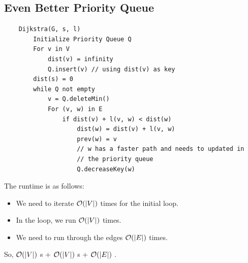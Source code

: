 \documentclass[letterpaper]{article}
\begin{document}
\subsection{Even Better Priority Queue}
\begin{verbatim}
    Dijkstra(G, s, l)
        Initialize Priority Queue Q 
        For v in V
            dist(v) = infinity
            Q.insert(v) // using dist(v) as key
        dist(s) = 0
        while Q not empty
            v = Q.deleteMin()
            For (v, w) in E
                if dist(v) + l(v, w) < dist(w)
                    dist(w) = dist(v) + l(v, w)
                    prev(w) = v
                    // w has a faster path and needs to updated in
                    // the priority queue 
                    Q.decreaseKey(w)
\end{verbatim}
The runtime is as follows: 
\begin{itemize}
    \item We need to iterate $\mathcal{O}(|V|)$ times for the initial loop. 
    \item In the  loop, we run $\mathcal{O}(|V|)$ times. 
    \item We need to run through the edges $\mathcal{O}(|E|)$ times. 
\end{itemize}
So, $\mathcal{O}(|V|)$ s + $\mathcal{O}(|V|)$ s + $\mathcal{O}(|E|)$ .
\end{document}
